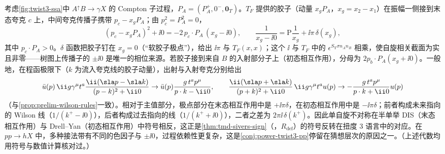 \begin{example}[最低阶的软胶子极点机制]\label{ex:power-sgp}
考虑\cref{fig:twist3-ssa}中 $A^\uparrow B\to\gamma X$ 的 Compton 子过程，$P_A=(P_A^+,0^-,\mathbf0_T)$。$T_F$ 提供的胶子（动量 $x_gP_A$，$x_g=x_2-x_1$）在振幅一侧接到末态夸克 $c$ 上，中间夸克传播子携带 $p_c-x_gP_A$；由 $p_c^2=P_A^2=0$，
\begin{equation}\label{eq:power-sgp-den}
(p_c-x_gP_A)^2+\ii0=-2\,p_c\cdot P_A\,(x_g-\ii0),\qquad \frac{1}{x_g-\ii0}=\mathrm P\frac{1}{x_g}+\ii\pi\,\delta(x_g),
\end{equation}
其中 $p_c\cdot P_A>0$。$\delta$ 函数把胶子钉在 $x_g=0$（“软胶子极点”），给出 $\ii\pi$ 与 $T_F(x,x)$；这个 $\ii$ 与 $T_F$ 中的 $\epsilon^{S_{\mathrm T}\sigma n_An_B}$ 相乘，使自旋相关截面为实且非零——树图上传播子的 $\pm\ii0$ 是唯一的相位来源。若胶子接到来自 $B$ 的入射部分子上（初态相互作用），分母为 $2p_b\cdot P_A(x_g+\ii0)$。一般地，在程函极限下（$k$ 为流入夸克线的胶子动量），出射与入射夸克分别给出
\begin{equation}\label{eq:power-sgp-eik}
\bar u(p)\,\ii g\gamma^\mu t^a\frac{\ii(\sla p-\sla k)}{(p-k)^2+\ii0}\to\bar u(p)\frac{g\,t^ap^\mu}{p\cdot k-\ii0},\qquad
\frac{\ii(\sla p+\sla k)}{(p+k)^2+\ii0}\,\ii g\gamma^\mu t^au(p)\to-\frac{g\,t^ap^\mu}{p\cdot k+\ii0}u(p)
\end{equation}
（与\cref{prop:prelim-wilson-rules}一致）。相对于主值部分，极点部分在末态相互作用中是 $+\ii\pi\delta$，在初态相互作用中是 $-\ii\pi\delta$；前者构成未来指向的 Wilson 线（$1/(k^+-\ii0)$），后者构成过去指向的线（$1/(k^++\ii0)$），二者之差为 $2\pi\ii\,\delta(k^+)$。因此单自旋不对称在半单举 DIS（末态相互作用）与 Drell--Yan（初态相互作用）中符号相反，这正是\cref{thm:tmd-sivers-sign}（\tagR，$R_{\mathrm{def}}$）的符号反转在扭度 3 语言中的对应。在 $pp\to hX$ 中，多种接法带有不同的色因子与 $\pm\ii0$，过程依赖性更复杂，这是\cref{conj:power-twist3-pp}停留在猜想层次的原因之一。（上述代数均用符号与数值计算核对过。）
\end{example}

